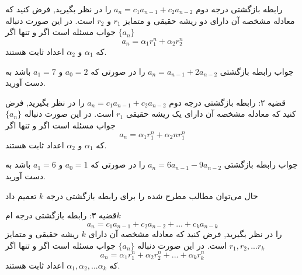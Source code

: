 \begin{THEOREM}
    \p
    رابطه‌ بازگشتی درجه دوم
    $a_n=c_1 a_{n-1}+c_2 a_{n-2}$
    را در نظر بگیرید, فرض کنید که معادله مشخصه آن دارای دو ریشه حقیقی و متمایز 
    $r_1$ و $r_2$
    است.
    در این صورت دنباله 
    $\{a_n\}$
    جواب مسئله است اگر و تنها اگر
    \[a_n=\alpha_1 r_1^n+\alpha_2 r_2^n\]
    که
    $\alpha_1$
    و
    $\alpha_2$
    اعداد ثابت هستند.

\end{THEOREM}
\begin{PROBLEM}
    \p
    جواب رابطه‌ بازگشتی 
    $a_n=a_{n-1}+2a_{n-2}$
    را در صورتی که
    $a_0=2$
    و
    $a_1=7$
    باشد به دست آورید.
\end{PROBLEM}
\begin{THEOREM}
    \p
    قضیه ۲:
    رابطه‌ بازگشتی درجه دوم
    $a_n=c_1 a_{n-1}+c_2 a_{n-2}$
    را در نظر بگیرید, فرض کنید که معادله مشخصه آن دارای یک ریشه حقیقی 
    $r_1$
    است.
    در این صورت دنباله 
    $\{a_n\}$
    جواب مسئله است اگر و تنها اگر
    \[a_n=\alpha_1 r_1^n+\alpha_2 nr_1^n\]
    که
    $\alpha_1$
    و
    $\alpha_2$
    اعداد ثابت هستند.

\end{THEOREM}
\begin{PROBLEM}
    \p
    جواب رابطه‌ بازگشتی 
    $a_n=6a_{n-1}-9a_{n-2}$
    را در صورتی که
    $a_0=1$
    و
    $a_1=6$
    باشد به دست آورید.
\end{PROBLEM}
\p
حال می‌توان مطالب مطرح شده را برای رابطه‌ بازگشتی درجه
$k$
تعمیم داد
\begin{THEOREM}
    \p
    قضیه ۳:
    رابطه‌ بازگشتی درجه 
    ام$k$
    \[a_n=c_{1}a_{n-1}+c_{2}a_{n-2}+...+c_{k}a_{n-k}\]
    را در نظر بگیرید, فرض کنید که معادله مشخصه آن دارای 
    $k$
    ریشه حقیقی و متمایز 
    $r_1, r_2, ...r_k $
    است.
    در این صورت دنباله 
    $\{a_n\}$
    جواب مسئله است اگر و تنها اگر
    \[a_n=\alpha_1 r_1^n+\alpha_2 r_2^n+...+\alpha_k r_k^n\]
    که
    $\alpha_1,\alpha_2,...\alpha_k$
    اعداد ثابت هستند.

\end{THEOREM}

